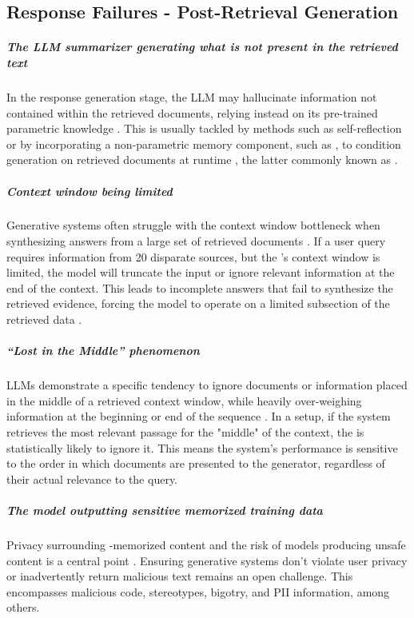 \subsection{Response Failures - Post-Retrieval Generation}

\subparagraph{The LLM summarizer generating what is not present in the retrieved text}
In the response generation stage, the LLM may hallucinate information not contained within the retrieved documents, relying instead on its pre-trained parametric knowledge \cite{huang-a-survey}. This is usually tackled by methods such as self-reflection \cite{jason-wei-chainofthought-prompting,akari-asai-selfrag-learning} or by incorporating a non-parametric memory component, such as , to condition generation on retrieved documents at runtime \cite{patrick-lewis-retrievalaugmented-generation}, the latter commonly known as .

\subparagraph{Context window being limited}
Generative systems often struggle with the context window bottleneck when synthesizing answers from a large set of retrieved documents \cite{xiaoxi-li-from-matching}. If a user query requires information from 20 disparate sources, but the 's context window is limited, the model will truncate the input or ignore relevant information at the end of the context. This leads to incomplete answers that fail to synthesize the retrieved evidence, forcing the model to operate on a limited subsection of the retrieved data \cite{mindfulragfailure}. 

\subparagraph{``Lost in the Middle'' phenomenon}
LLMs demonstrate a specific tendency to ignore documents or information placed in the middle of a retrieved context window, while heavily over-weighing information at the beginning or end of the sequence \cite{ragseven}. 
In a  setup, if the system retrieves the most relevant passage for the "middle" of the context, the  is statistically likely to ignore it. This means the system's performance is sensitive to the order in which documents are presented to the generator, regardless of their actual relevance to the query.

\subparagraph{The model outputting sensitive memorized training data}
Privacy surrounding -memorized content and the risk of models producing unsafe content is a central point \cite{xiaoxi-li-from-matching}. Ensuring generative systems don't violate user privacy or inadvertently return malicious text remains an open challenge. This encompasses malicious code, stereotypes, bigotry, and PII information, among others.

